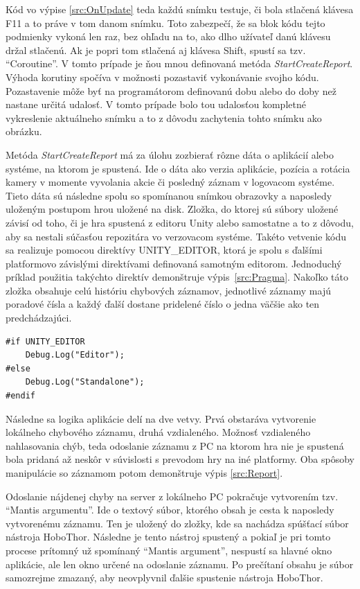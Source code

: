 \documentclass[slovak, bachelorpractice]{diploma}
\begin{document}
Kód vo výpise \ref{src:OnUpdate} teda každú snímku testuje, či bola stlačená klávesa F11 a to práve v tom danom snímku. Toto zabezpečí, že sa blok kódu tejto podmienky vykoná len raz, bez ohľadu na to, ako dlho užívateľ danú klávesu držal stlačenú. Ak je popri tom stlačená aj klávesa Shift, spustí sa tzv. \enquote{Coroutine}. V tomto prípade je ňou mnou definovaná metóda \textit{StartCreateReport}. Výhoda korutiny spočíva v možnosti pozastaviť vykonávanie svojho kódu. Pozastavenie môže byť na programátorom definovanú dobu alebo do doby než nastane určitá udalosť. V tomto prípade bolo tou udalosťou kompletné vykreslenie aktuálneho snímku a to z dôvodu zachytenia tohto snímku ako obrázku.

Metóda \textit{StartCreateReport} má za úlohu zozbierať rôzne dáta o aplikácií alebo systéme, na ktorom je spustená. Ide o dáta ako verzia aplikácie, pozícia a rotácia kamery v momente vyvolania akcie či posledný záznam v logovacom systéme. Tieto dáta sú následne spolu so spomínanou snímkou obrazovky a naposledy uloženým postupom hrou uložené na disk. Zložka, do ktorej sú súbory uložené závisí od toho, či je hra spustená z editoru Unity alebo samostatne a to z dôvodu, aby sa nestali súčasťou repozitára vo verzovacom systéme. Takéto vetvenie kódu sa realizuje pomocou direktívy UNITY\_EDITOR, ktorá je spolu s ďalšími platformovo závislými direktívami definovaná samotným editorom. Jednoduchý príklad použitia takýchto direktív demonštruje \mbox{výpis \ref{src:Pragma}}. Nakoľko táto zložka obsahuje celú históriu chybových záznamov, jednotlivé záznamy majú poradové čísla a každý ďalší dostane pridelené číslo o jedna väčšie ako ten predchádzajúci.
\vspace{10pt}
\begin{lstlisting}[label=src:Pragma,caption={Ukážka použitia direktívy UNITY\_EDITOR}]
#if UNITY_EDITOR
	Debug.Log("Editor");                
#else
    Debug.Log("Standalone");             
#endif
\end{lstlisting}

Následne sa logika aplikácie delí na dve vetvy. Prvá obstaráva vytvorenie lokálneho chybového záznamu, druhá vzdialeného. Možnosť vzdialeného nahlasovania chýb, teda odoslanie záznamu z PC na ktorom hra nie je spustená bola pridaná až neskôr v súvislosti s prevodom hry na iné platformy. Oba spôsoby manipulácie so záznamom potom demonštruje výpis \ref{src:Report}.

Odoslanie nájdenej chyby na server z lokálneho PC pokračuje vytvorením tzv. \enquote{Mantis argumentu}. Ide o textový súbor, ktorého obsah je cesta k naposledy vytvorenému záznamu. Ten je uložený do zložky, kde sa nachádza spúšťací súbor nástroja HoboThor. Následne je tento nástroj spustený a pokiaľ je pri tomto procese prítomný už spomínaný \enquote{Mantis argument}, nespustí sa hlavné okno aplikácie, ale len okno určené na odoslanie záznamu. Po prečítaní obsahu je súbor samozrejme zmazaný, aby neovplyvnil ďalšie spustenie nástroja HoboThor.
\end{document}
